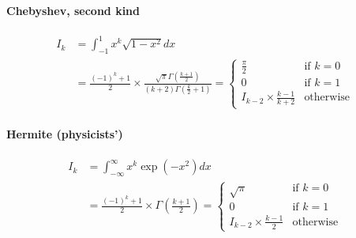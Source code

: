 \documentclass{scrartcl}
\begin{document}
\paragraph{Chebyshev, second kind}
\[
  \begin{split}
  I_k
    &= \int_{-1}^1 x^k \sqrt{1 - x^2} dx\\
    &= \frac{(-1)^k + 1}{2} \times \frac{\sqrt{\pi} \Gamma(\frac{k+1}{2})}{(k + 2) \Gamma(\frac{k}{2} + 1)}
  = \begin{cases}
    \frac{\pi}{2}&\text{if $k = 0$}\\
    0&\text{if $k = 1$}\\
    I_{k-2} \times \frac{k-1}{k + 2}&\text{otherwise}
  \end{cases}
  \end{split}
\]


\paragraph{Hermite (physicists')}

\begin{equation}\label{ndimhermitephys}
  \begin{split}
    I_k
    &= \int_{-\infty}^\infty x^k \exp(-x^2) dx\\
    &= \frac{(-1)^k + 1}{2} \times \Gamma\left(\frac{k+1}{2}\right)
    = \begin{cases}
      \sqrt{\pi}&\text{if $k = 0$}\\
      0&\text{if $k = 1$}\\
      I_{k-2} \times \frac{k-1}{2}&\text{otherwise}
    \end{cases}
  \end{split}
\end{equation}
\end{document}
